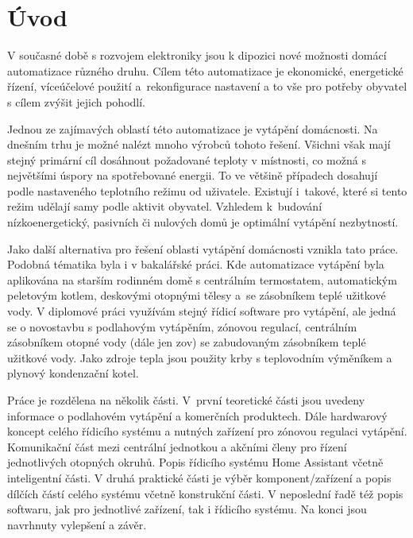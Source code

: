 \chapter{Úvod}

V současné době s rozvojem elektroniky jsou k dipozici nové možnosti domácí automatizace různého druhu. Cílem této automatizace je ekonomické, energetické řízení, víceúčelové použití a~rekonfigurace nastavení a to vše pro potřeby obyvatel s cílem zvýšit jejich pohodlí.


Jednou ze zajímavých oblastí této automatizace je vytápění domácnosti. Na dnešním trhu je možné nalézt mnoho výrobců tohoto řešení. Všichni však mají stejný primární cíl dosáhnout požadované teploty v místnosti, co možná s největšími úspory na spotřebované energii. To ve většině případech dosahují podle nastaveného teplotního režimu od uživatele. Existují i~takové, které si tento režim udělají samy podle aktivit obyvatel. Vzhledem k~budování nízkoenergetický, pasivních či nulových domů je optimální vytápění nezbytností.

Jako další alternativa pro řešení oblasti vytápění domácnosti vznikla tato práce. Podobná tématika byla i v bakalářské práci. Kde automatizace vytápění byla aplikována na starším rodinném domě s centrálním termostatem, automatickým peletovým kotlem, deskovými otopnými tělesy a~se zásobníkem teplé užitkové vody. V diplomové práci využívám stejný řídicí software pro vytápění, ale jedná se o novostavbu s podlahovým vytápěním, zónovou regulací, centrálním zásobníkem otopné vody (dále jen \acrshort{zov}) se zabudovaným zásobníkem teplé užitkové vody. Jako zdroje tepla jsou použity krby s teplovodním výměníkem a plynový kondenzační kotel.

Práce je rozdělena na několik části. V~první teoretické části jsou uvedeny informace o podlahovém vytápění a komerčních produktech. Dále hardwarový koncept celého řídicího systému a nutných zařízení pro zónovou regulaci vytápění. Komunikační část mezi centrální jednotkou a akčními členy pro řízení jednotlivých otopných okruhů. Popis řídicího systému Home Assistant včetně inteligentní části. V druhá praktické části je výběr komponent/zařízení a popis dílčích částí celého systému včetně konstrukční části. V neposlední řadě též popis softwaru, jak pro jednotlivé zařízení, tak i řídicího systému. Na konci jsou navrhnuty vylepšení a závěr.

\newpage
